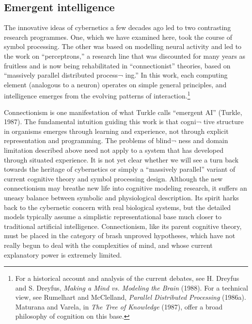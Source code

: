\documentclass[12pt]{article}
\begin{document}
\subsection{Emergent intelligence}

The innovative ideas of cybernetics a few decades ago led to two contrasting research programmes. One, which we have examined here, took the course of symbol processing. The other was based on modelling neural activity and led to the work on ``perceptrons,'' a research line that was discounted for many years as fruitless and is now being rehabilitated in ``connectionist'' theories, based on ``massively parallel distributed process¬ ing.'' In this work, each computing element (analogous to a neuron) operates on simple general principles, and intelligence emerges from the evolving patterns of interaction.\footnote{For a historical account and analysis of the current debates, see H. Dreyfus and S. Dreyfus, {\it Making a Mind vs. Modeling the Brain} (1988). For a technical view, see Rumelhart and McClelland, {\it Parallel Distributed Processing} (1986a). Maturana and Varela, in {\it The Tree of Knowledge} (1987), offer a broad philosophy of cognition on this base.}

Connectionism is one manifestation of what Turkle calls ``emergent AI'' (Turkle, 1987). The fundamental intuition guiding this work is that cogni¬ tive structure in organisms emerges through learning and experience, not through explicit representation and programming. The problems of blind¬ ness and domain limitation described above need not apply to a system that has developed through situated experience.
It is not yet clear whether we will see a turn back towards the heritage of cybernetics or simply a ``massively parallel'' variant of current cognitive theory and symbol processing design. Although the new connectionism may breathe new life into cognitive modeling research, it suffers an uneasy balance between symbolic and physiological description. Its spirit harks back to the cybernetic concern with real biological systems, but the detailed models typically assume a simplistic representational base much closer to traditional artificial intelligence. Connectionism, like its parent cognitive theory, must be placed in the category of brash unproved hypotheses, which have not really begun to deal with the complexities of mind, and whose current explanatory power is extremely limited.
\end{document}
